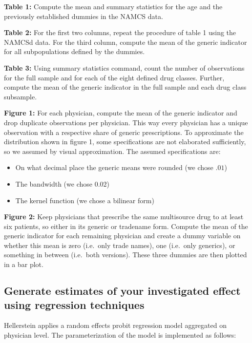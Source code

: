 \documentclass[
]{book}
\providecommand{\tightlist}{%
  \setlength{\itemsep}{0pt}\setlength{\parskip}{0pt}}
\begin{document}
\textbf{Table 1:} Compute the mean and summary statistics for the age
and the previously established dummies in the NAMCS data.

\textbf{Table 2:} For the first two columns, repeat the procedure of
table 1 using the NAMCSd data. For the third column, compute the mean of
the generic indicator for all subpopulations defined by the dummies.

\textbf{Table 3:} Using summary statistics command, count the number of
observations for the full sample and for each of the eight defined drug
classes. Further, compute the mean of the generic indicator in the full
sample and each drug class subsample.

\textbf{Figure 1:} For each physician, compute the mean of the generic
indicator and drop duplicate observations per physician. This way every
physician has a unique observation with a respective share of generic
prescriptions. To approximate the distribution shown in figure 1, some
specifications are not elaborated sufficiently, so we assumed by visual
approximation. The assumed specifications are:

\begin{itemize}
\tightlist
\item
  On what decimal place the generic means were rounded (we chose
  \(.01\))
\item
  The bandwidth (we chose \(0.02\))
\item
  The kernel function (we chose a bilinear form)
\end{itemize}

\textbf{Figure 2:} Keep physicians that prescribe the same multisource
drug to at least six patients, so either in its generic or tradename
form. Compute the mean of the generic indicator for each remaining
physician and create a dummy variable on whether this mean is zero
(i.e.~only trade names), one (i.e.~only generics), or something in
between (i.e.~both versions). These three dummies are then plotted in a
bar plot.

\hypertarget{generate-estimates-of-your-investigated-effect-using-regression-techniques-1}{%
\subsection{Generate estimates of your investigated effect using
regression
techniques}\label{generate-estimates-of-your-investigated-effect-using-regression-techniques-1}}

Hellerstein applies a random effects probit regression model aggregated
on physician level. The parameterization of the model is implemented as
follows:
\end{document}
